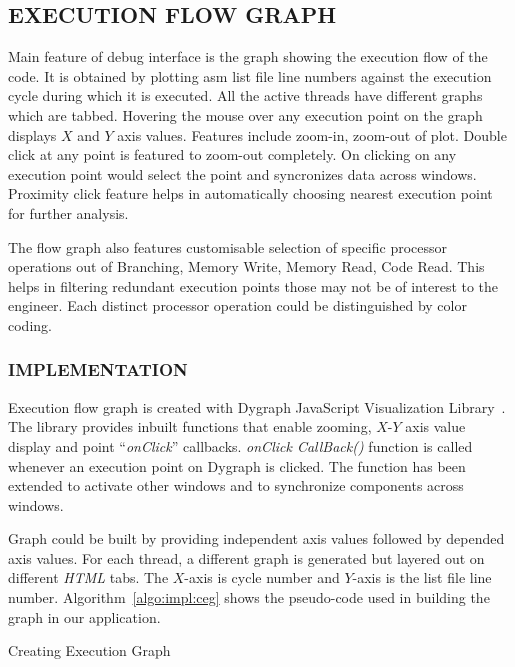 \subsection {EXECUTION FLOW GRAPH}
Main feature of debug interface is the graph showing the execution flow of the code. It is obtained by plotting asm list file line numbers against the execution cycle during which it is executed. All the active threads have different graphs which are tabbed. Hovering the mouse over any execution point on the graph displays $X$ and $Y$ axis values. Features include zoom-in, zoom-out of plot. Double click at any point is featured to zoom-out completely. On clicking on any execution point would select the point and syncronizes data across windows. Proximity click feature helps in automatically choosing nearest execution point for further analysis.
 
The flow graph also features customisable selection of specific processor operations out of Branching, Memory Write, Memory Read, Code Read. This helps in filtering redundant execution points those may not be of interest to the engineer. Each distinct processor operation could be distinguished by color coding.   

\subsubsection {IMPLEMENTATION}

Execution flow graph is created with Dygraph JavaScript Visualization Library~\citep{http:dygraphs}. The library provides inbuilt functions that enable zooming, $X$-$Y$ axis value display and point ``{\it onClick}'' callbacks. {\it onClick CallBack()} function is called whenever an execution point on Dygraph is clicked. The function has been extended to activate other windows and to synchronize components across windows.

Graph could be built by providing independent axis values followed by depended axis values. For each thread, a different graph is generated but layered out on different {\it HTML} tabs. The $X$-axis is cycle number and $Y$-axis is the list file line number. Algorithm~\ref{algo:impl:ceg} shows the pseudo-code used in building the graph in our application.

\IncMargin{1em}
\begin{algorithm}[h]
\DontPrintSemicolon
{} 
\KwFn{}
\BlankLine
{}
\caption{Creating Execution Graph}
\label{algo:impl:ceg}
\end{algorithm}\DecMargin{1em}

